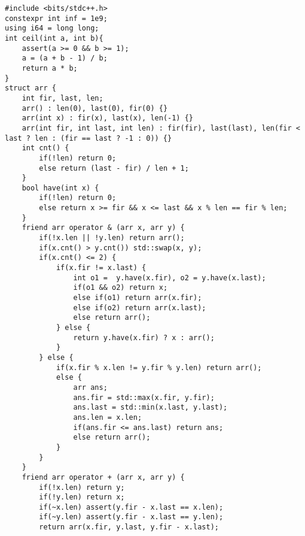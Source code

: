 \begin{verbatim}
#include <bits/stdc++.h>
constexpr int inf = 1e9;
using i64 = long long;
int ceil(int a, int b){
	assert(a >= 0 && b >= 1);
	a = (a + b - 1) / b;
	return a * b;
}
struct arr {
	int fir, last, len;
	arr() : len(0), last(0), fir(0) {}
	arr(int x) : fir(x), last(x), len(-1) {}
	arr(int fir, int last, int len) : fir(fir), last(last), len(fir < last ? len : (fir == last ? -1 : 0)) {}
	int cnt() {
		if(!len) return 0;
		else return (last - fir) / len + 1;
	}
	bool have(int x) {
		if(!len) return 0;
		else return x >= fir && x <= last && x % len == fir % len;
	}
	friend arr operator & (arr x, arr y) {
		if(!x.len || !y.len) return arr();
		if(x.cnt() > y.cnt()) std::swap(x, y);
		if(x.cnt() <= 2) {
			if(x.fir != x.last) {
				int o1 =  y.have(x.fir), o2 = y.have(x.last);
				if(o1 && o2) return x;
				else if(o1) return arr(x.fir);
				else if(o2) return arr(x.last);
				else return arr();
			} else {
				return y.have(x.fir) ? x : arr();
			}
		} else {
			if(x.fir % x.len != y.fir % y.len) return arr();
			else {
				arr ans;
				ans.fir = std::max(x.fir, y.fir);
				ans.last = std::min(x.last, y.last);
				ans.len = x.len;
				if(ans.fir <= ans.last) return ans;
				else return arr();
			}
		}
	}
	friend arr operator + (arr x, arr y) {
		if(!x.len) return y;
		if(!y.len) return x;
		if(~x.len) assert(y.fir - x.last == x.len);
		if(~y.len) assert(y.fir - x.last == y.len);
		return arr(x.fir, y.last, y.fir - x.last);
		

\end{verbatim}
